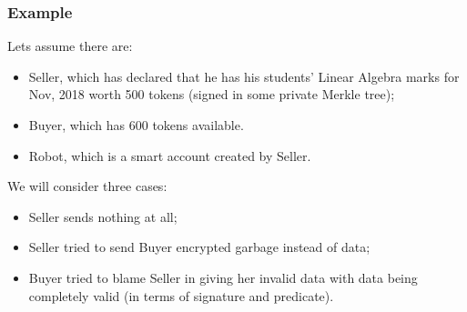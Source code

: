 \subsubsection{Example}

Lets assume there are:
\begin{itemize}
  \item Seller, which has declared that he has his students' Linear Algebra marks for Nov, 2018 worth 500 tokens (signed in some private Merkle tree);
  \item Buyer, which has 600 tokens available.
  \item Robot, which is a smart account created by Seller.
\end{itemize}

We will consider three cases:
\begin{itemize}
  \item Seller sends nothing at all;
  \item Seller tried to send Buyer encrypted garbage instead of data;
  \item Buyer tried to blame Seller in giving her invalid data with data being completely valid (in terms of signature and predicate).
\end{itemize}

